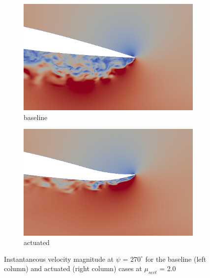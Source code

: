 \begin{figure}[H]
	\centering
	
	\begin{subfigure}[b]{0.4\textwidth}
		\centering
		\includegraphics[width=1\textwidth]{figures/mu_2pt0/baseline/ph_270_velocity_zoomed_airfoil_0_to_1pt5.png}
		\caption{ baseline}
		\label{fig:mu_2pt0_baseline_zoomed_velocity}
	\end{subfigure}
	\begin{subfigure}[b]{0.4\textwidth}
		\centering
		\includegraphics[width=1\textwidth]{figures/mu_2pt0/AC/ph_270_velocity_zoomed_airfoil_0_to_1pt5.png}
		\caption{actuated}
		\label{fig:mu_2pt0_AC_zoomed_velocity}
	\end{subfigure}
	\caption{Instantaneous velocity magnitude at $\psi$ = $270^\circ$ for the baseline (left column) and actuated (right column) cases at $\mu_{sect}$ = 2.0}
	\label{fig:mu_2pt0_zoomed_velocity}
\end{figure}

